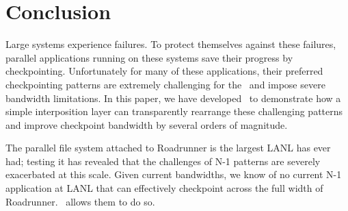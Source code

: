 \section{Conclusion}
\label{conclude}

Large systems experience failures.  To protect themselves against these
failures, parallel applications running on these systems save their progress by
checkpointing.  Unfortunately for many of these applications, their preferred
checkpointing patterns are extremely challenging for the \upfs\ and impose
severe bandwidth limitations.  In this paper, we have developed \plfs\ to
demonstrate how a simple interposition layer can transparently rearrange these
challenging patterns and improve checkpoint bandwidth by several orders of
magnitude.

The parallel file system attached to Roadrunner is the largest LANL has ever
had; testing it has revealed that the challenges of N-1 patterns are severely
exacerbated at this scale.  Given current bandwidths, we know of no current N-1
application at LANL that can effectively checkpoint across the full width of
Roadrunner.  \plfs\ allows them to do so. 
